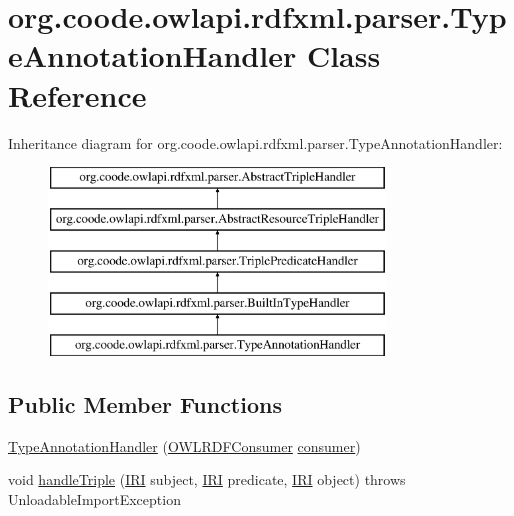 \hypertarget{classorg_1_1coode_1_1owlapi_1_1rdfxml_1_1parser_1_1_type_annotation_handler}{\section{org.\-coode.\-owlapi.\-rdfxml.\-parser.\-Type\-Annotation\-Handler Class Reference}
\label{classorg_1_1coode_1_1owlapi_1_1rdfxml_1_1parser_1_1_type_annotation_handler}
}
Inheritance diagram for org.\-coode.\-owlapi.\-rdfxml.\-parser.\-Type\-Annotation\-Handler\-:\begin{figure}[H]
\begin{center}
\leavevmode
\includegraphics[height=5.000000cm]{classorg_1_1coode_1_1owlapi_1_1rdfxml_1_1parser_1_1_type_annotation_handler}
\end{center}
\end{figure}
\subsection*{Public Member Functions}
\begin{DoxyCompactItemize}
\item 
\hyperlink{classorg_1_1coode_1_1owlapi_1_1rdfxml_1_1parser_1_1_type_annotation_handler_ac2b05561c54565a5c9aaae160ab2c332}{Type\-Annotation\-Handler} (\hyperlink{classorg_1_1coode_1_1owlapi_1_1rdfxml_1_1parser_1_1_o_w_l_r_d_f_consumer}{O\-W\-L\-R\-D\-F\-Consumer} \hyperlink{classorg_1_1coode_1_1owlapi_1_1rdfxml_1_1parser_1_1_abstract_triple_handler_a4ccf4d898ff01eb1cadfa04b23d54e9c}{consumer})
\item 
void \hyperlink{classorg_1_1coode_1_1owlapi_1_1rdfxml_1_1parser_1_1_type_annotation_handler_a33637bd2104121a4e05232c57318b428}{handle\-Triple} (\hyperlink{classorg_1_1semanticweb_1_1owlapi_1_1model_1_1_i_r_i}{I\-R\-I} subject, \hyperlink{classorg_1_1semanticweb_1_1owlapi_1_1model_1_1_i_r_i}{I\-R\-I} predicate, \hyperlink{classorg_1_1semanticweb_1_1owlapi_1_1model_1_1_i_r_i}{I\-R\-I} object)  throws Unloadable\-Import\-Exception 
\end{DoxyCompactItemize}
